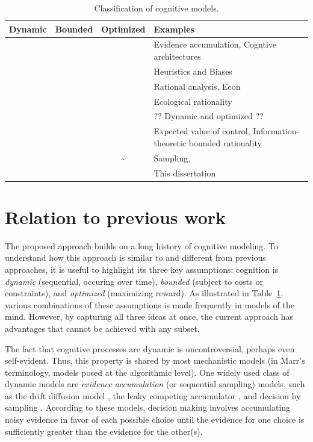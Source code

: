 \newcommand{\yes}{\checkmark &}
\begin{table}[tb]
  \caption{Classification of cognitive models.}
  \label{tab:comparison}
  \centering
  \begin{tabular}{ccc|p{\dimexpr\textwidth - 7cm}}
  \toprule
  Dynamic & Bounded & Optimized & Examples \\
  \midrule
  \yes & &
    Evidence accumulation, Cogntive architectures
  \\ & \yes & 
    Heuristics and Biases
  \\ & & \yes
    Rational analysis, Econ
  \\ \yes \yes &
    Ecological rationality
  \\ \yes & \yes 
    ?? Dynamic and optimized ??
  \\ & \yes \yes 
    Expected value of control, Information-theoretic bounded rationality
  \\ \yes \yes \textasciitilde &
    Sampling, 
  \\ \yes \yes \yes
    This dissertation 
  \\ \bottomrule
  \end{tabular}
\end{table}

\section{Relation to previous work}


The proposed approach builds on a long history of cognitive modeling. To understand how this approach is similar to and different from previous approaches, it is useful to highlight its three key assumptions: cognition is \emph{dynamic} (sequential, occuring over time), \emph{bounded} (subject to costs or constraints), and \emph{optimized} (maximizing reward). As illustrated in Table~\ref{tab:comparison}, various combinations of these assumptions is made frequently in models of the mind. However, by capturing all three ideas at once, the current approach has advantages that cannot be achieved with any subset.

The fact that cognitive processes are dynamic is uncontroversial, perhaps even self-evident. Thus, this property is shared by most mechanistic models (in Marr's terminology, models posed at the algorithmic level). One widely used class of dynamic models are \emph{evidence accumulation} (or sequential sampling) models, such as the drift diffusion model \citep{ratcliff1978theory}, the leaky competing accumulator \citep{usher2001time}, and decision by sampling \citep{stewart2006decision}. According to these models, decision making involves accumulating noisy evidence in favor of each possible choice until the evidence for one choice is sufficiently greater than the evidence for the other(s). 

